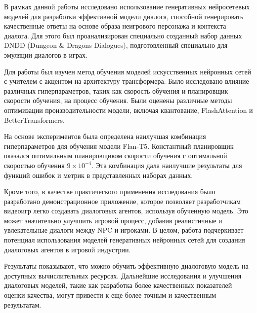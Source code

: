 В рамках данной работы исследовано использование генеративных нейросетевых моделей для разработки эффективной модели диалога, способной генерировать качественные ответы на основе образа неигрового персонажа и контекста диалога. Для этого был проанализирован специально созданный набор данных DNDD (Dungeon \& Dragons Dialogues), подготовленный специально для эмуляции диалогов в играх.

Для работы был изучен метод обучения моделей искусственных нейронных сетей с учителем с акцентом на архитектуру трансформера. Было исследовано влияние различных гиперпараметров, таких как скорость обучения и планировщик скорости обучения, на процесс обучения. Были оценены различные методы оптимизации производительности модели, включая квантование, FlashAttention и BetterTransformers.

На основе экспериментов была определена наилучшая комбинация гиперпараметров для обучения модели Flan-T5. Константный планировщик оказался оптимальным планировщиком скорости обучения с оптимальной скоростью обучения $9 \times 10^{-4}$. Эта комбинация дала наилучшие результаты для функций ошибок и метрик в представленных наборах данных.

Кроме того, в качестве практического применения исследования было разработано демонстрационное приложение, которое позволяет разработчикам видеоигр легко создавать диалоговых агентов, используя обученную модель. Это может значительно улучшить игровой процесс, добавив реалистичные и увлекательные диалоги между NPC и игроками. В целом, работа подчеркивает потенциал использования моделей генеративных нейронных сетей для создания диалоговых агентов в игровой индустрии.

Результаты показывают, что можно обучить эффективную диалоговую модель на доступных вычислительных ресурсах. Дальнейшие исследования и улучшения диалоговых моделей, такие как разработка более качественных показателей оценки качества, могут привести к еще более точным и качественным результатам.